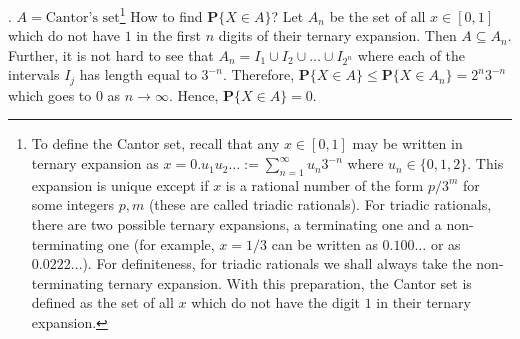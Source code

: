 \documentclass[preprint,  11pt]{amsart}
\newcommand{\parag}[1]{\vspace{4mm}\noindent{\bfseries #1}}
\theoremstyle{plain} %
\theoremstyle{definition} %
\begin{document}
{{{{{{{{{{{{{{{{{{{\parag{2}. $A=\mbox{Cantor's set}$\footnote{To define the Cantor set, recall that any  $x\in [0,1]$ may be written in ternary expansion as $x=0.u_{1}u_{2}\ldots :=\sum_{n=1}^{\infty}u_{n}3^{-n}$ where $u_{n}\in \{0,1,2\}$. This expansion is unique except if $x$ is a rational number of the form $p/3^{m}$ for some integers $p,m$ (these are called triadic rationals). For triadic rationals, there are two possible ternary expansions, a terminating one and a non-terminating one (for example, $x=1/3$ can be written as $0.100\ldots$ or as $0.0222\ldots$). For definiteness, for triadic rationals we shall always take the non-terminating ternary expansion. With this preparation, the Cantor set is defined as the set of all $x$ which do not have the digit $1$ in their ternary expansion.} How to find $\mathbf{P}\{X\in A\}$? Let $A_{n}$ be the set of all $x\in [0,1]$ which do not have $1$ in the first $n$ digits of their ternary expansion. Then $A\subseteq A_{n}$. Further, it is not hard to see that $A_{n}=I_{1}\cup I_{2}\cup \ldots \cup I_{2^{n}}$ where each of the intervals $I_{j}$ has length equal to $3^{-n}$. Therefore, $\mathbf{P}\{X\in A\}\le \mathbf{P}\{X\in A_{n}\}= 2^{n}3^{-n}$ which goes to $0$ as $n\rightarrow \infty$. Hence, $\mathbf{P}\{X\in A\}=0$.
}
}}}}}}}}}}}}}}}}}}
\end{document}
